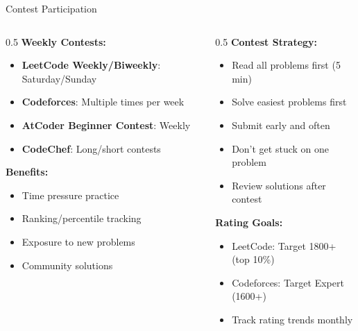 \documentclass[aspectratio=169,xcolor=dvipsnames]{beamer}
\begin{document}
\begin{frame}{Contest Participation}
  \begin{columns}
    \begin{column}{0.5\textwidth}
      \textbf{Weekly Contests:}
      \begin{itemize}
        \item \textbf{LeetCode Weekly/Biweekly}: Saturday/Sunday
        \item \textbf{Codeforces}: Multiple times per week
        \item \textbf{AtCoder Beginner Contest}: Weekly
        \item \textbf{CodeChef}: Long/short contests
      \end{itemize}

      \vspace{0.3cm}
      \textbf{Benefits:}
      \begin{itemize}
        \item Time pressure practice
        \item Ranking/percentile tracking
        \item Exposure to new problems
        \item Community solutions
      \end{itemize}
    \end{column}

    \begin{column}{0.5\textwidth}
      \textbf{Contest Strategy:}
      \begin{itemize}
        \item Read all problems first (5 min)
        \item Solve easiest problems first
        \item Submit early and often
        \item Don't get stuck on one problem
        \item Review solutions after contest
      \end{itemize}

      \vspace{0.3cm}
      \textbf{Rating Goals:}
      \begin{itemize}
        \item LeetCode: Target 1800+ (top 10\%)
        \item Codeforces: Target Expert (1600+)
        \item Track rating trends monthly
      \end{itemize}
    \end{column}
  \end{columns}
\end{frame}
\end{document}
